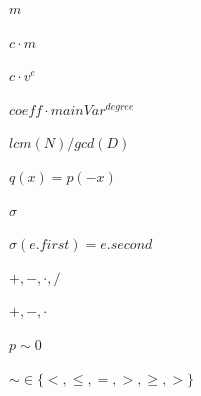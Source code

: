 \documentclass{article}
\begin{document}
$ m $
\pagebreak

$ c \cdot m $
\pagebreak

$ c \cdot v^e $
\pagebreak

$ coeff \cdot mainVar^{degree} $
\pagebreak

$ lcm(N) / gcd(D) $
\pagebreak

$ q(x) = p(-x) $
\pagebreak

$\sigma$
\pagebreak

$\sigma(e.first) = e.second$
\pagebreak

$+,-,\cdot,/$
\pagebreak

$+, -, \cdot$
\pagebreak

$p \sim 0$
\pagebreak

$\sim \in \{ <, \leq, =, >, \geq, > \}$
\pagebreak
\end{document}
